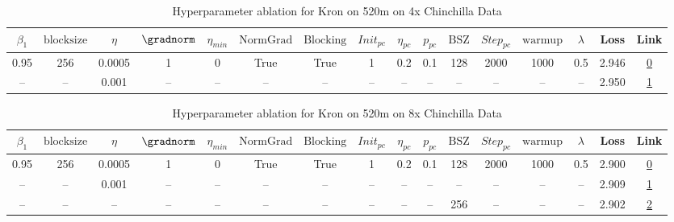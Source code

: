 \begin{table}[H]
\centering
\caption{Hyperparameter ablation for Kron on 520m on 4x Chinchilla Data}
\label{tab:ablation_kron_520m_on_4x_chinchilla_data}
\begin{tabular}{cccccccccccccccc}
\toprule
$\beta_1$ & $\mathrm{block size}$ & $\eta$ & $\gradnorm$ & $\eta_{min}$ & $\mathrm{NormGrad}$ & $\mathrm{Blocking}$ & $Init_{pc}$ & $\eta_{pc}$ & $p_{pc}$ & $\mathrm{BSZ}$ & $Step_{pc}$ & $\mathrm{warmup}$ & $\lambda$ & Loss & Link \\
\midrule
0.95 & 256 & 0.0005 & 1 & 0 & True & True & 1 & 0.2 & 0.1 & 128 & 2000 & 1000 & 0.5 & 2.946 & \href{https://wandb.ai/stanford-mercury/optimizer-scaling/runs/sweep-520m-42B-kronf21245lr0.0005-wd0.5-b10.95-plr0.2-pis1-gn1-n-e5e732}{0} \\
\midrule
-- & -- & 0.001 & -- & -- & -- & -- & -- & -- & -- & -- & -- & -- & -- & 2.950 & \href{https://wandb.ai/stanford-mercury/optimizer-scaling/runs/sweep-520m-42B-kron644022lr0.001-wd0.5-b10.95-plr0.2-pis1-gn1-no-bbd127}{1} \\
\bottomrule
\end{tabular}
\end{table}

\begin{table}[H]
\centering
\caption{Hyperparameter ablation for Kron on 520m on 8x Chinchilla Data}
\label{tab:ablation_kron_520m_on_8x_chinchilla_data}
\begin{tabular}{cccccccccccccccc}
\toprule
$\beta_1$ & $\mathrm{block size}$ & $\eta$ & $\gradnorm$ & $\eta_{min}$ & $\mathrm{NormGrad}$ & $\mathrm{Blocking}$ & $Init_{pc}$ & $\eta_{pc}$ & $p_{pc}$ & $\mathrm{BSZ}$ & $Step_{pc}$ & $\mathrm{warmup}$ & $\lambda$ & Loss & Link \\
\midrule
0.95 & 256 & 0.0005 & 1 & 0 & True & True & 1 & 0.2 & 0.1 & 128 & 2000 & 1000 & 0.5 & 2.900 & \href{https://wandb.ai/stanford-mercury/optimizer-scaling/runs/sweep-520m-85B-kronc2a9f5lr0.0005-wd0.5-b10.95-plr0.2-pis1-gn1-n-7f654e}{0} \\
\midrule
-- & -- & 0.001 & -- & -- & -- & -- & -- & -- & -- & -- & -- & -- & -- & 2.909 & \href{https://wandb.ai/stanford-mercury/optimizer-scaling/runs/sweep-520m-85B-kronea1c73lr0.001-wd0.5-b10.95-plr0.2-pis1-gn1-no-82b169}{1} \\
-- & -- & -- & -- & -- & -- & -- & -- & -- & -- & 256 & -- & -- & -- & 2.902 & \href{https://wandb.ai/stanford-mercury/optimizer-scaling/runs/sweep-520m-85B-kronf21245lr0.0005-wd0.5-b10.95-plr0.2-pis1-gn1-n-6bceac}{2} \\
\bottomrule
\end{tabular}
\end{table}

